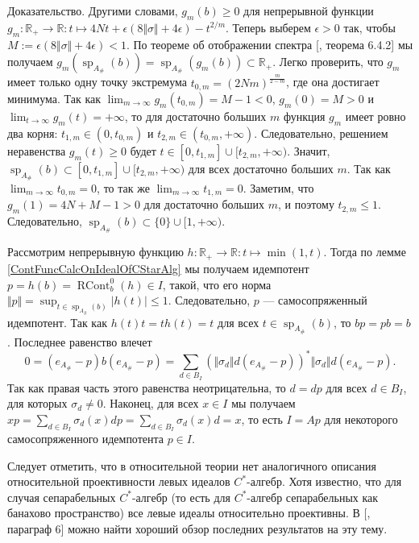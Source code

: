 \documentclass[12pt]{article}
\numberwithin{equation}{subsection}
\theoremstyle{plain}
\newenvironment{proof}{Доказательство.}{}
\begin{document}
\begin{fulltext}
\begin{proof}
Другими словами, $g_m(b)\geq 0$ для непрерывной функции $g_m:\mathbb{R}_+\to\mathbb{R}:t\mapsto 4Nt+\epsilon(8\Vert\sigma\Vert+4\epsilon)-t^{2/m}$. Теперь выберем $\epsilon>0$ так, чтобы $M:=\epsilon(8\Vert\sigma\Vert+4\epsilon)<1$. По теореме об отображении спектра [\cite{HelLectAndExOnFuncAn}, теорема 6.4.2] мы получаем $g_m(\operatorname{sp}_{A_\#}(b))=\operatorname{sp}_{A_\#}(g_m(b))\subset\mathbb{R}_+$. Легко проверить, что $g_m$ имеет только одну точку экстремума $t_{0,m}=(2Nm)^{\frac{m}{2-m}}$, где она достигает минимума. Так как $\lim_{m\to\infty} g_m(t_{0,m})=M-1<0$, $g_m(0)=M>0$ и $\lim_{t\to\infty} g_m(t)=+\infty$, то для достаточно больших $m$ функция $g_m$ имеет ровно два корня: $t_{1,m}\in(0,t_{0,m})$ и $t_{2,m}\in(t_{0,m},+\infty)$. Следовательно, решением неравенства $g_m(t)\geq 0$ будет $t\in[0,t_{1,m}]\cup[t_{2,m},+\infty)$. Значит, $\operatorname{sp}_{A_\#}(b)\subset[0,t_{1,m}]\cup[t_{2,m},+\infty)$ для всех достаточно больших $m$. Так как $\lim_{m\to\infty} t_{0,m}=0$, то так же $\lim_{m\to\infty} t_{1,m}=0$. Заметим, что $g_m(1)=4N+M-1>0$ для достаточно больших $m$, и поэтому $t_{2,m}\leq 1$. Следовательно, $\operatorname{sp}_{A_\#}(b)\subset\{0\}\cup[1,+\infty)$.

Рассмотрим непрерывную функцию $h:\mathbb{R}_+\to\mathbb{R}:t\mapsto\min(1, t)$. Тогда по лемме \ref{ContFuncCalcOnIdealOfCStarAlg} мы получаем идемпотент $p=h(b)=\operatorname{RCont}_b^0(h)\in I$, такой, что его норма $\Vert p\Vert=\sup_{t\in\operatorname{sp}_{A_\#}(b)}|h(t)|\leq 1$. Следовательно, $p$ --- самосопряженный идемпотент. Так как $h(t)t=th(t)=t$ для всех $t\in \operatorname{sp}_{A_\#}(b)$, то $bp=pb=b$. Последнее равенство влечет
$$
0=(e_{A_\#}-p)b(e_{A_\#}-p)=\sum_{d\in B_I}(\Vert\sigma_d\Vert d(e_{A_\#}-p))^*\Vert\sigma_d\Vert d(e_{A_\#}-p).
$$
Так как правая часть этого равенства неотрицательна, то $d=dp$ для всех $d\in B_I$, для которых $\sigma_d\neq 0$. Наконец, для всех $x\in I$ мы получаем $xp=\sum_{d\in B_I}\sigma_d(x)dp=\sum_{d\in B_I}\sigma_d(x)d=x$, то есть $I=Ap$ для некоторого самосопряженного идемпотента $p\in I$.
\end{proof}

Следует отметить, что в относительной теории нет аналогичного описания относительной проективности левых идеалов $C^*$-алгебр. Хотя известно, что для случая сепарабельных $C^*$-алгебр (то есть для $C^*$-алгебр сепарабельных как банахово пространство) все левые идеалы относительно проективны. В [\cite{LykProjOfBanAndCStarAlgsOfContFld}, параграф 6] можно найти хороший обзор последних результатов на эту тему.


\end{fulltext}
\end{document}
